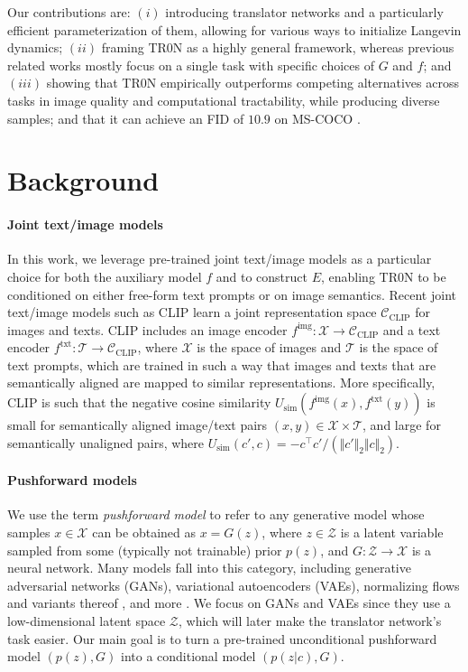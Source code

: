 \documentclass[nohyperref]{article}
\theoremstyle{plain}
\theoremstyle{definition}
\theoremstyle{remark}
\begin{document}
Our contributions are: $(i)$ introducing translator networks and a particularly efficient parameterization of them, allowing for various ways to initialize Langevin dynamics; $(ii)$ framing TR0N as a highly general framework, whereas previous related works mostly focus on a single task with specific choices of $G$ and $f$; and $(iii)$ showing that TR0N empirically outperforms competing alternatives across tasks in image quality and computational tractability, while producing diverse samples; and that it can achieve an FID \citep{Heusel2017GANsTB} of $10.9$ on MS-COCO \citep{lin2014microsoft}.
 
\section{Background}
\paragraph{Joint text/image models} In this work, we leverage pre-trained joint text/image models as a particular choice for both the auxiliary model $f$ and to construct $E$, enabling TR0N to be conditioned on either free-form text prompts or on image semantics. 
Recent joint text/image models such as CLIP learn a joint representation space $\mathcal{C}_\text{CLIP}$ for images and texts. 
CLIP includes an image encoder $f^{\text{img}}: \mathcal{X} \rightarrow \mathcal{C}_\text{CLIP}$ and a text encoder $f^{\text{txt}}:\mathcal{T} \rightarrow \mathcal{C}_\text{CLIP}$, where $\mathcal{X}$ is the space of images and $\mathcal{T}$ is the space of text prompts, which are trained in such a way that images and texts that are semantically aligned are mapped to similar representations. 
More specifically, CLIP is such that the negative cosine similarity $U_{\text{sim}}(f^{\text{img}}(x), f^{\text{txt}}(y))$ is small for semantically aligned image/text pairs $(x, y) \in \mathcal{X} \times \mathcal{T}$, and large for semantically unaligned pairs, where $U_{\text{sim}}(c',c) = -c^\top c' / (\Vert c'\Vert_2 \Vert c \Vert_2)$.


\paragraph{Pushforward models} We use the term \emph{pushforward model} to refer to any generative model whose samples $x \in \mathcal{X}$ can be obtained as $x=G(z)$, where $z \in \mathcal{Z}$ is a latent variable sampled from some (typically not trainable) prior $p(z)$, and $G : \mathcal{Z} \rightarrow \mathcal{X}$ is a neural network. 
Many models fall into this category, including generative adversarial networks (GANs), variational autoencoders (VAEs), normalizing flows \citep{dinh2016density, durkan2019neural} and variants thereof \citep{brehmer2020flows, caterini2021rectangular, ross2021tractable}, and more \citep{tolstikhin2017wasserstein,loaiza2022diagnosing}. We focus on GANs and VAEs since they use a low-dimensional latent space $\mathcal{Z}$, which will later make the translator network's task easier. Our main goal is to turn a pre-trained unconditional pushforward model $(p(z), G)$ into a conditional model $(p(z|c), G)$.
\end{document}
